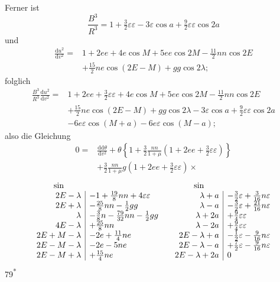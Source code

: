 \noindent Ferner ist
\[
\frac{B^3}{R^3}=1+\tfrac32\varepsilon\varepsilon-3\varepsilon\cos a
+\tfrac92\varepsilon\varepsilon\cos2a
\]
\noindent und
\[
\begin{aligned}
\frac{\mathrm{d}u^2}{\mathrm{d}v^2}={}&1+2ee+4e\cos M+5ee\cos2M
-\tfrac{11}{2}nn\cos2E\\
&+\tfrac{15}{2}ne\cos(2E-M)+gg\cos2\lambda;
\end{aligned}
\]
\noindent folglich
\[
\begin{aligned}
\frac{B^3}{R^3}\frac{\mathrm{d}u^2}{\mathrm{d}v^2}
={}&1+2ee+\tfrac32\varepsilon\varepsilon+4e\cos M+5ee\cos2M
-\tfrac{11}{2}nn\cos2E\\
&+\tfrac{15}{2}ne\cos(2E-M)+gg\cos2\lambda
-3\varepsilon\cos a+\tfrac92\varepsilon\varepsilon\cos2a\\
&-6e\varepsilon\cos(M+a)-6e\varepsilon\cos(M-a);
\end{aligned}
\]
\noindent also die Gleichung
\[
\begin{aligned}
0={}&\frac{\mathrm{dd}\theta}{\mathrm{d}v^2}
+\theta\left\{1+\frac32\frac{nn}{1+\mu}(1+2ee+\tfrac32\varepsilon\varepsilon)\right\}\\
&+\frac32\frac{nn}{1+\mu}g(1+2ee+\tfrac32\varepsilon\varepsilon)\times
\end{aligned}
\]
\begingroup\small
\setlength{\arraycolsep}{3pt}\renewcommand{\arraystretch}{1.5}
\[
\begin{array}{r|l@{\qquad}r|l}
\multicolumn{1}{c}{\sin}& &\multicolumn{1}{c}{\sin}&\\
2E-\lambda&-1+\tfrac{19}{8}nn+4\varepsilon\varepsilon
 &\lambda+a&-\tfrac32\varepsilon+\tfrac{3}{16}n\varepsilon\\
2E+\lambda&-\tfrac{25}{8}nn-\tfrac12gg
 &\lambda-a&-\tfrac32\varepsilon+\tfrac{21}{16}n\varepsilon\\
\lambda&-\tfrac38n-\tfrac{79}{32}nn-\tfrac12gg
 &\lambda+2a&+\tfrac94\varepsilon\varepsilon\\
4E-\lambda&+\tfrac{25}{8}nn
 &\lambda-2a&+\tfrac94\varepsilon\varepsilon\\
2E+M-\lambda&-2e+\tfrac{11}{4}ne
 &2E-\lambda+a&-\tfrac12\varepsilon-\tfrac{9}{16}n\varepsilon\\
2E-M-\lambda&-2e-5ne
 &2E-\lambda-a&+\tfrac72\varepsilon-\tfrac{9}{16}n\varepsilon\\
2E-M+\lambda&+\tfrac{15}{4}ne
 &2E-\lambda+2a&0
\end{array}
\]
\endgroup
\noindent\hfill79\textsuperscript{*}\par
{}
